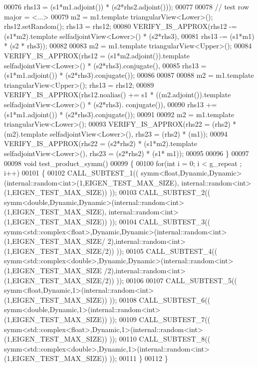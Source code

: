 \begin{DoxyCode}
00076                    rhs13 = (s1*m1.adjoint()) * (s2*rhs2.adjoint()));
00077 
00078   \textcolor{comment}{// test row major = <...>}
00079   m2 = m1.template triangularView<Lower>(); rhs12.setRandom(); rhs13 = rhs12;
00080   VERIFY\_IS\_APPROX(rhs12 -= (s1*m2).\textcolor{keyword}{template} selfadjointView<Lower>() * (s2*rhs3),
00081                    rhs13 -= (s1*m1) * (s2 * rhs3));
00082 
00083   m2 = m1.template triangularView<Upper>();
00084   VERIFY\_IS\_APPROX(rhs12 = (s1*m2.adjoint()).\textcolor{keyword}{template} selfadjointView<Lower>() * (s2*rhs3).conjugate(),
00085                    rhs13 = (s1*m1.adjoint()) * (s2*rhs3).conjugate());
00086 
00087 
00088   m2 = m1.template triangularView<Upper>(); rhs13 = rhs12;
00089   VERIFY\_IS\_APPROX(rhs12.noalias() += s1 * ((m2.adjoint()).\textcolor{keyword}{template} selfadjointView<Lower>() * (s2*rhs3).
      conjugate()),
00090                    rhs13 += (s1*m1.adjoint()) * (s2*rhs3).conjugate());
00091 
00092   m2 = m1.template triangularView<Lower>();
00093   VERIFY\_IS\_APPROX(rhs22 = (rhs2) * (m2).\textcolor{keyword}{template} selfadjointView<Lower>(), rhs23 = (rhs2) * (m1));
00094   VERIFY\_IS\_APPROX(rhs22 = (s2*rhs2) * (s1*m2).\textcolor{keyword}{template} selfadjointView<Lower>(), rhs23 = (s2*rhs2) * (s1*
      m1));
00095 
00096 \}
00097 
00098 \textcolor{keywordtype}{void} test\_product\_symm()
00099 \{
00100   \textcolor{keywordflow}{for}(\textcolor{keywordtype}{int} i = 0; i < g\_repeat ; i++)
00101   \{
00102     CALL\_SUBTEST\_1(( symm<float,Dynamic,Dynamic>(internal::random<int>(1,EIGEN\_TEST\_MAX\_SIZE),
      internal::random<int>(1,EIGEN\_TEST\_MAX\_SIZE)) ));
00103     CALL\_SUBTEST\_2(( symm<double,Dynamic,Dynamic>(internal::random<int>(1,EIGEN\_TEST\_MAX\_SIZE),
      internal::random<int>(1,EIGEN\_TEST\_MAX\_SIZE)) ));
00104     CALL\_SUBTEST\_3(( symm<std::complex<float>,Dynamic,Dynamic>(internal::random<int>(1,EIGEN\_TEST\_MAX\_SIZE/
      2),internal::random<int>(1,EIGEN\_TEST\_MAX\_SIZE/2)) ));
00105     CALL\_SUBTEST\_4(( symm<std::complex<double>,Dynamic,Dynamic>(internal::random<int>(1,EIGEN\_TEST\_MAX\_SIZE
      /2),internal::random<int>(1,EIGEN\_TEST\_MAX\_SIZE/2)) ));
00106 
00107     CALL\_SUBTEST\_5(( symm<float,Dynamic,1>(internal::random<int>(1,EIGEN\_TEST\_MAX\_SIZE)) ));
00108     CALL\_SUBTEST\_6(( symm<double,Dynamic,1>(internal::random<int>(1,EIGEN\_TEST\_MAX\_SIZE)) ));
00109     CALL\_SUBTEST\_7(( symm<std::complex<float>,Dynamic,1>(internal::random<int>(1,EIGEN\_TEST\_MAX\_SIZE)) ));
00110     CALL\_SUBTEST\_8(( symm<std::complex<double>,Dynamic,1>(internal::random<int>(1,EIGEN\_TEST\_MAX\_SIZE)) ));
00111   \}
00112 \}
\end{DoxyCode}
